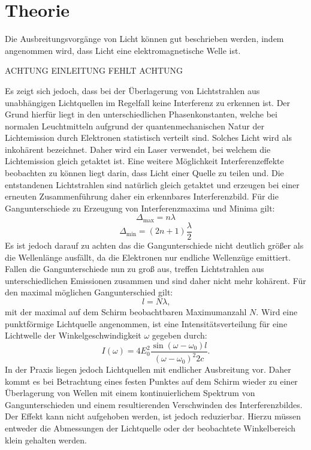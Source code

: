 
\section{Theorie}
\label{sec:Theorie}
Die Ausbreitungsvorgänge von Licht können gut beschrieben werden, indem angenommen
wird, dass Licht eine elektromagnetische Welle ist.

ACHTUNG
EINLEITUNG FEHLT
ACHTUNG

Es zeigt sich jedoch, dass bei der Überlagerung von Lichtstrahlen aus unabhängigen
Lichtquellen im Regelfall keine Interferenz zu erkennen ist. Der Grund hierfür liegt
 in den unterschiedlichen Phasenkonstanten, welche bei normalen Leuchtmitteln aufgrund
 der quantenmechanischen Natur der Lichtemission durch Elektronen statistisch verteilt sind.
 Solches Licht wird als inkohärent bezeichnet. Daher wird ein Laser verwendet, bei welchem die Lichtemission gleich getaktet ist.
 Eine weitere Möglichkeit Interferenzeffekte beobachten zu können liegt darin, dass Licht einer Quelle zu teilen und.
 Die entstandenen Lichtstrahlen sind natürlich gleich getaktet und erzeugen bei einer erneuten Zusammenführung
 daher ein erkennbares Interferenzbild. Für die Gangunterschiede zu Erzeugung von Interferenzmaxima und Minima gilt:
 \begin{equation}
   \Delta_\text{max} = n \lambda
 \end{equation}
   \begin{equation}
   \Delta_\text{min} = \left(2 n+1\right)\frac{\lambda}{2}
 \end{equation}
Es ist jedoch darauf zu achten das die Gangunterschiede nicht deutlich größer als
die Wellenlänge ausfällt, da die Elektronen nur endliche Wellenzüge emittiert. Fallen
die Gangunterschiede nun zu groß aus, treffen Lichtstrahlen aus unterschiedlichen Emissionen
 zusammen und sind daher nicht mehr kohärent. Für den maximal möglichen Gangunterschied gilt:
 \begin{equation}
   l = N \lambda \text{,}
 \end{equation}
mit der maximal auf dem Schirm beobachtbaren Maximumanzahl $N$. Wird eine punktförmige
Lichtquelle angenommen, ist eine Intensitätsverteilung für eine Lichtwelle der Winkelgeschwindigkeit $\omega$ gegeben durch:
\begin{equation}
  I(\omega) = 4 E^2_0 \frac{\sin(\omega -\omega_0) l }{\left(\omega - \omega_0\right)^2 2 c}\text{.}
  \end{equation}
  In der Praxis liegen jedoch Lichtquellen mit endlicher Ausbreitung vor. Daher kommt es bei
  Betrachtung eines festen Punktes auf dem Schirm wieder zu einer Überlagerung von Wellen
  mit einem kontinuierlichem Spektrum von Gangunterschieden und einem resultierenden Verschwinden des Interferenzbildes.
  Der Effekt kann nicht aufgehoben werden, ist jedoch reduzierbar. Hierzu müssen entweder die Abmessungen der Lichtquelle
  oder der beobachtete Winkelbereich klein gehalten werden.

